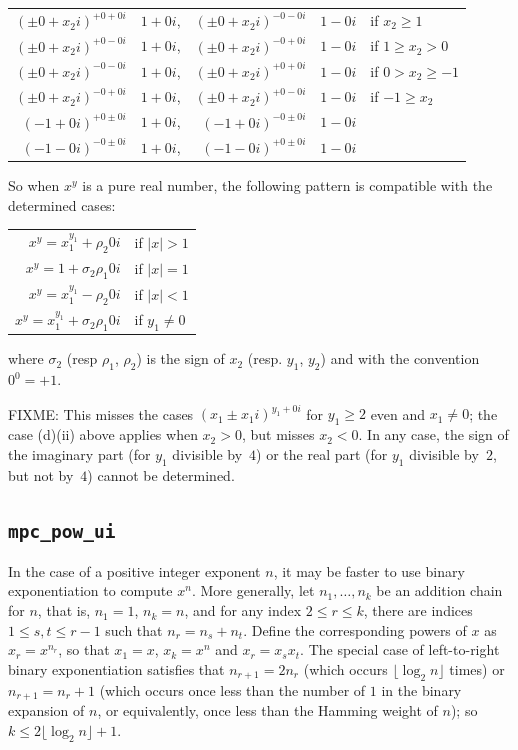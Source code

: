 \documentclass [11pt]{article}
\newcommand {\corr}[1]{{#1}}
\renewcommand {\leq}{\leqslant}
\renewcommand {\geq}{\geqslant}
\begin{document}
\begin{tabular}{r@{ $=$ }lr@{ $=$ }ll}
  $(\pm 0 +x_2i)^{+0 +0i}$ & $1 +0i$, &
  $(\pm 0 +x_2i)^{-0 -0i}$ & $1 -0i$ &
  if $x_2 \geq 1$ \\
  $(\pm 0 +x_2i)^{+0 -0i}$ & $1 +0i$, &
  $(\pm 0 +x_2i)^{-0 +0i}$ & $1 -0i$ &
  if $1 \geq x_2 > 0$ \\
  $(\pm 0 +x_2i)^{-0 -0i}$ & $1 +0i$, &
  $(\pm 0 +x_2i)^{+0 +0i}$ & $1 -0i$ &
  if $ 0 > x_2 \geq -1$ \\
  $(\pm 0 +x_2i)^{-0 +0i}$ & $1 +0i$, &
  $(\pm 0 +x_2i)^{+0 -0i}$ & $1 -0i$ &
  if $-1 \geq x_2$ \\

  $(-1 +0i)^{+0 \pm0i}$ & $1+0i$, &
  $(-1 +0i)^{-0 \pm0i}$ & $1-0i$ \\
  $(-1 -0i)^{-0 \pm0i}$ & $1+0i$, &
  $(-1 -0i)^{+0 \pm0i}$ & $1-0i$ \\
\end{tabular}

So when $x^y$ is a pure real number, the following pattern is compatible with
the determined cases:

\begin{tabular}{rl}
  $x^y = x_1^{y_1} + \rho_2 0i$ & if $|x| > 1$\\
  $x^y = 1 + \sigma_2 \rho_1 0i$ & if $|x| = 1$\\
  $x^y = x_1^{y_1} - \rho_2 0i$ & if $|x| < 1$\\
  $x^y = x_1^{y_1} + \sigma_2 \rho_1 0i$ & if $y_1 \neq 0$
\end{tabular}

where $\sigma_2$ (resp $\rho_1$, $\rho_2$) is the sign of $x_2$ (resp. $y_1$,
$y_2$) and with the convention $0^0=+1$.

FIXME: This misses the cases $(x_1 \pm x_1 i)^{y_1 + 0 i}$ for $y_1 \geq 2$
even and $x_1 \neq 0$; the case (d)(ii) above applies when $x_2 > 0$, but
misses $x_2 < 0$. In any case, the sign of the imaginary part
(for $y_1$ divisible by~$4$)
or the real part
(for $y_1$ divisible by~$2$, but not by~$4$)
cannot be determined.


\subsection {\texttt {mpc\_pow\_ui}}
\label {ssec:mpcpowui}

In the case of a positive integer exponent $n$, it may be faster to use
binary exponentiation to compute $x^n$. More generally, let
$n_1, \ldots, n_k$ be an addition chain for $n$, that is, $n_1 = 1$,
$n_k = n$, and for any index $2 \leq r \leq k$, there are indices
$1 \leq s, t \leq r-1$ such that $n_r = n_s + n_t$. Define the corresponding
powers of $x$ as $\corr x_r = x^{n_r}$, so that $\corr x_1 = x$,
$\corr x_k = x^n$ and $\corr x_r = \corr x_s \corr x_t$.
The special case of left-to-right binary exponentiation
satisfies that $n_{r+1} = 2 n_r$ (which occurs $\lfloor \log_2 n \rfloor$
times) or $n_{r+1} = n_r + 1$ (which occurs once less than the number of
$1$ in the binary expansion of $n$, or equivalently, once less than the
Hamming weight of $n$); so $k \leq 2 \lfloor \log_2 n \rfloor + 1$.
\end{document}
